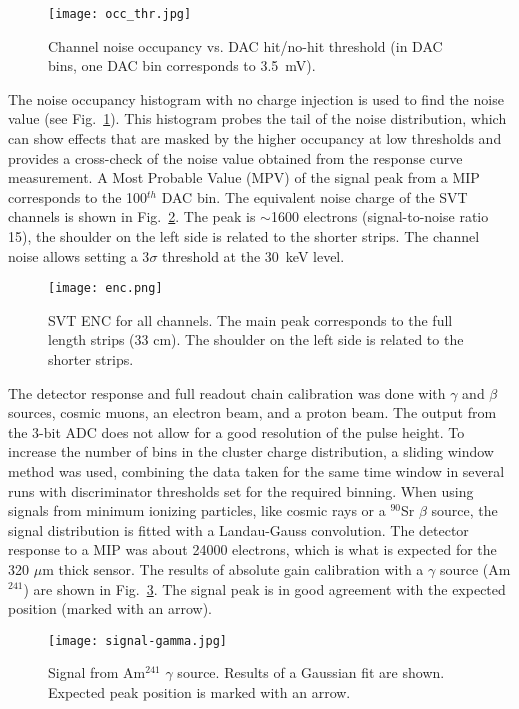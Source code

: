 \begin{figure}[hbt] 
\centering 
\texttt{[image: occ\_thr.jpg]}
\caption{Channel noise occupancy vs. DAC hit/no-hit threshold (in DAC bins, one DAC bin corresponds to 3.5~mV).}
\label{fig:noiseocc}
\end{figure}

The noise occupancy histogram with no charge injection is used to find the noise value (see Fig.~\ref{fig:noiseocc}). This histogram probes the tail of the noise distribution, which can show effects that are masked by the higher occupancy at low thresholds and provides a cross-check of the noise value obtained from the response curve measurement. A Most Probable Value (MPV) of the signal peak from a MIP corresponds to the 100$^{th}$ DAC bin. The equivalent noise charge of the SVT channels is shown in  Fig.~\ref{fig:enc}. The peak is $\sim$1600 electrons (signal-to-noise ratio 15), the shoulder on the left side is related to the shorter strips. The channel noise allows setting a 3$\sigma$ threshold at the 30~keV level. 

\begin{figure}[hbt] 
	\centering 
	\texttt{[image: enc.png]}
	\caption{SVT ENC for all channels. The main peak corresponds to the full length strips (33 cm). The shoulder on the left side is related to the shorter strips.}
	\label{fig:enc}
\end{figure}

The detector response and full readout chain calibration was done with $\gamma$ and $\beta$ sources, cosmic muons, an electron beam, and a proton beam. The output from the 3-bit ADC does not allow for a good resolution of the pulse height. To increase the number of bins in the cluster charge distribution, a sliding window method was used, combining the data taken for the same time window in several runs with discriminator thresholds set for the required binning. When using signals from minimum ionizing particles, like cosmic rays or a $^{90}$Sr $\beta$ source, the signal distribution is fitted with a Landau-Gauss convolution. The detector response to a MIP was about 24000 electrons, which is what is expected for the 320 $\mu$m thick sensor. The results of absolute gain calibration with a $\gamma$ source (Am$^{241}$) are shown in Fig.~\ref{fig:signal-gamma}. The signal peak is in good agreement with the expected position (marked with an arrow). 

\begin{figure}[hbt] 
	\centering 
	\texttt{[image: signal-gamma.jpg]}
	\caption{Signal from Am$^{241}$ $\gamma$ source. Results of a Gaussian fit are shown. Expected peak position is marked with an arrow.}
	\label{fig:signal-gamma}
\end{figure}

